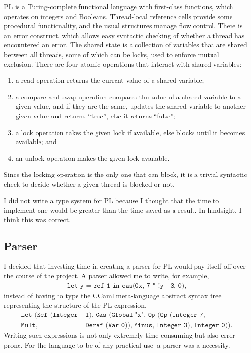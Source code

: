 \documentclass[12pt,a4paper,twoside,openright]{report}
\begin{document}
PL is a Turing-complete functional
language with first-class
functions, which operates on integers and
Booleans.
Thread-local reference cells provide some
procedural functionality, and the usual
structures manage flow control. There is
an error construct, which allows easy syntactic
checking of whether a thread has encountered
an error. The shared
state is a collection of variables that are
shared between all threads, some of which
can be locks, used to enforce mutual exclusion.
There are four atomic operations
that interact with shared variables:
\begin{enumerate}
	\item a read operation returns the current value
	of a shared variable;
	\item a compare-and-swap operation
	compares the value of a shared variable to a
	given value, and if they are the same, updates
	the shared variable to another given value and returns
	``true'', else it returns ``false'';
	\item a lock operation takes the given lock if
	available, else blocks until it becomes available; and
	\item an unlock operation makes the given lock
	available.
\end{enumerate}
Since the locking operation is the only
one that can block, it is a trivial syntactic
check to decide whether a given thread is
blocked or not.

I did not write a type system for PL because
I thought that the time to implement one would
be greater than the time saved as a result. In hindsight,
I think this was correct.

\subsection{Parser}
I decided that investing time in creating a
parser for PL would pay itself off over the course of the project.
A parser allowed me to write, for example,
\begin{align*}
	\texttt{let y = ref 1 in cas(Gx, 7 * !y - 3, 0)},
\end{align*}
instead of having to type the OCaml meta-language abstract
syntax tree representing the structure of the PL expression,
\begin{align*}
	\texttt{Let (Ref (Integer}& \texttt{ 1), Cas (Global "x",
		Op (Op (Integer 7,} \\ \texttt{Mult,}& \texttt{ Deref (Var 0)), Minus, Integer 3),
		Integer 0))}.
\end{align*}
Writing such expressions is not only extremely time-consuming but
also error-prone. For the language to be of any practical use,
a parser was a necessity.
\end{document}
